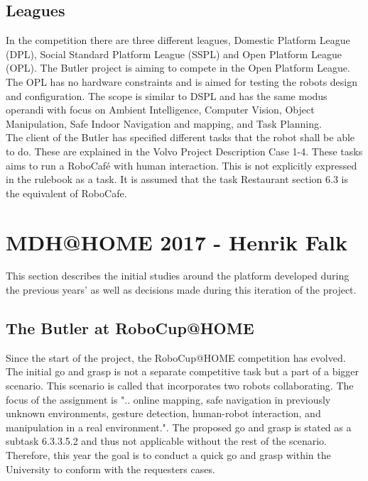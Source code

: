 \subsection{Leagues}
In the competition there are three different leagues, Domestic Platform League (DPL), Social Standard Platform League (SSPL) and Open Platform League (OPL). The Butler project is aiming to compete in the Open Platform League.\\
\indent The OPL has no hardware constraints and is aimed for testing the robots design and configuration. The scope is similar to DSPL and has the same modus operandi with focus on Ambient Intelligence, Computer Vision, Object Manipulation, Safe Indoor Navigation and mapping, and Task Planning.\\
\indent The client of the Butler has specified different tasks that the robot shall be able to do. These are explained in the Volvo Project Description Case 1-4. These tasks aims to run a RoboCafé with human interaction. This is not explicitly expressed in the rulebook as a task. It is assumed that the task Restaurant section 6.3 is the equivalent of RoboCafe.\\


\section{MDH@HOME 2017 - Henrik Falk}
This section describes the initial studies around the platform developed during the previous years' as well as decisions made during this iteration of the project.

\subsection{The Butler at RoboCup@HOME}
Since the start of the project, the RoboCup@HOME competition has evolved. The initial go and grasp is not a separate competitive task but a part of a bigger scenario. This scenario is called  that incorporates two robots collaborating. The focus of the assignment is ".. online mapping, safe navigation in previously unknown environments, gesture detection, human-robot interaction, and manipulation in a real environment."\cite{robocup-rulebook}. The proposed go and grasp is stated as a subtask 6.3.3.5.2 and thus not applicable without the rest of the scenario. \\
\indent Therefore, this year the goal is to conduct a quick go and grasp within the University to conform with the requesters cases.


